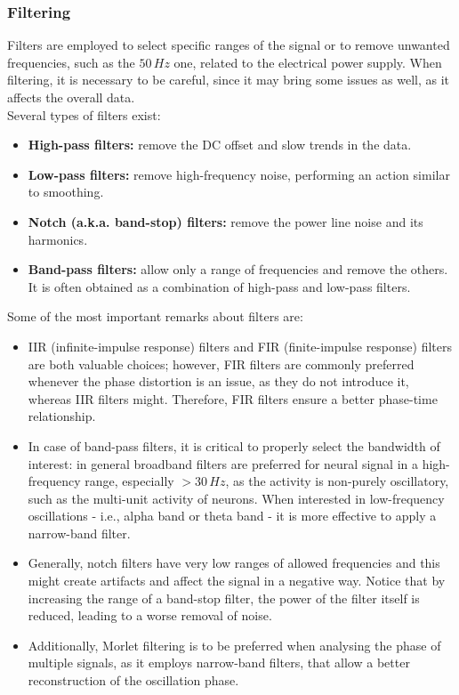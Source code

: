 \subsubsection{Filtering}
Filters are employed to select specific ranges of the signal or to remove unwanted frequencies,
such as the \(50\,Hz\) one, related to the electrical power supply. When filtering, it is
necessary to be careful, since it may bring some issues as well, as it affects the overall
data.\\
Several types of filters exist:
\begin{itemize}
    \item \textbf{High-pass filters:} remove the DC offset and slow trends in the data.
    \item \textbf{Low-pass filters:} remove high-frequency noise, performing an action
          similar to smoothing.
    \item \textbf{Notch (a.k.a. band-stop) filters:} remove the power line noise and its harmonics.
    \item \textbf{Band-pass filters:} allow only a range of frequencies and remove the others.
          It is often obtained as a combination of high-pass and low-pass filters.
\end{itemize}
Some of the most important remarks about filters are:
\begin{itemize}
    \item IIR (infinite-impulse response) filters and FIR (finite-impulse response)
          filters are both valuable choices; however, FIR filters are commonly preferred
          whenever the phase distortion is an issue, as they do not introduce it, whereas
          IIR filters might. Therefore, FIR filters ensure a better phase-time relationship.
    \item In case of band-pass filters, it is critical to properly select the
          bandwidth of interest: in general broadband filters are preferred for neural
          signal in a high-frequency range, especially \(>30\,Hz\), as the activity
          is non-purely oscillatory, such as the multi-unit activity of neurons. When
          interested in low-frequency oscillations - i.e., alpha band or theta band - it is
          more effective to apply a narrow-band filter.
    \item Generally, notch filters have very low ranges of allowed frequencies and
          this might create artifacts and affect the signal in a negative way. Notice
          that by increasing the range of a band-stop filter, the power of the filter itself
          is reduced, leading to a worse removal of noise.
    \item Additionally, Morlet filtering is to be preferred when analysing the phase
          of multiple signals, as it employs narrow-band filters, that allow a better reconstruction
          of the oscillation phase.
\end{itemize}
